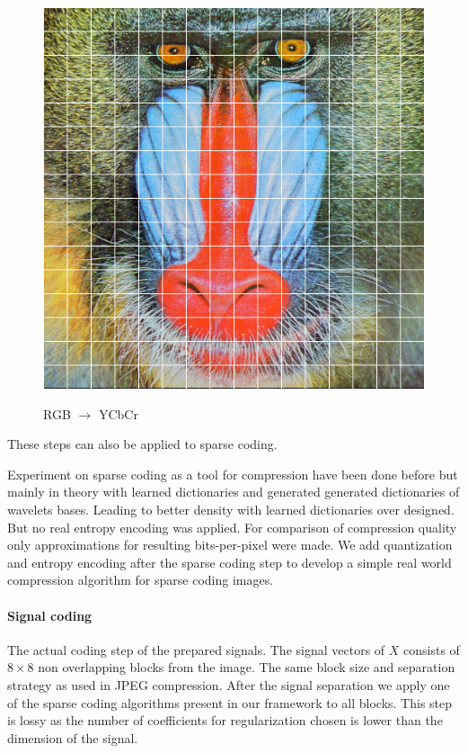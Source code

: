 \begin{figure}[h]
\centering
\includegraphics[scale = 0.25]{images/segmentation.png}
\label{fig:YCbCr}
\caption{RGB $\rightarrow$ YCbCr}
\end{figure}
These steps can also be applied to sparse coding.

Experiment on sparse coding as a tool for compression have been done
before\cite{Lewicki1999,?} but mainly in theory with learned dictionaries and
generated generated dictionaries of wavelets bases. Leading to better density
with learned dictionaries over designed. But no real entropy encoding was
applied. For comparison of compression quality only approximations for
resulting bits-per-pixel were made. We add quantization and entropy encoding
after the sparse coding step to develop a simple real world compression
algorithm for sparse coding images.



\paragraph{Signal coding}
The actual coding step of the prepared signals. The signal vectors of $X$
consists of $8\times 8$ non overlapping blocks from the image. The same block
size and separation strategy as used in JPEG compression. After the signal
separation we apply one of the sparse coding algorithms present in our framework
to all blocks. This step is lossy as the number of coefficients for
regularization chosen is lower than the dimension of the signal. 


